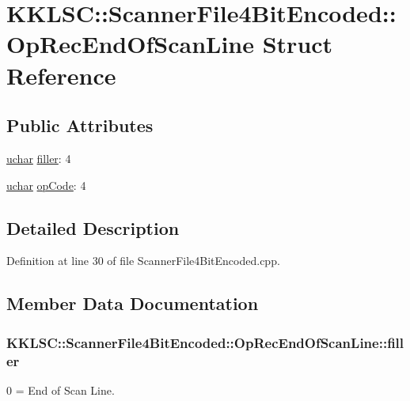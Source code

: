 \hypertarget{struct_scanner_file4_bit_encoded_1_1_op_rec_end_of_scan_line}{}\section{K\+K\+L\+SC\+:\+:Scanner\+File4\+Bit\+Encoded\+:\+:Op\+Rec\+End\+Of\+Scan\+Line Struct Reference}
\label{struct_scanner_file4_bit_encoded_1_1_op_rec_end_of_scan_line}
\subsection*{Public Attributes}
\begin{DoxyCompactItemize}
\item 
\hyperlink{namespace_k_k_b_ace9969169bf514f9ee6185186949cdf7}{uchar} \hyperlink{struct_scanner_file4_bit_encoded_1_1_op_rec_end_of_scan_line_ac7bd3d5670d4444b349b816d2b52c63d}{filler}\+: 4
\item 
\hyperlink{namespace_k_k_b_ace9969169bf514f9ee6185186949cdf7}{uchar} \hyperlink{struct_scanner_file4_bit_encoded_1_1_op_rec_end_of_scan_line_a26b256b20e4d267cbf6845f678cc4966}{op\+Code}\+: 4
\end{DoxyCompactItemize}


\subsection{Detailed Description}


Definition at line 30 of file Scanner\+File4\+Bit\+Encoded.\+cpp.



\subsection{Member Data Documentation}
\subsubsection[{\texorpdfstring{filler}{filler}}]{ K\+K\+L\+S\+C\+::\+Scanner\+File4\+Bit\+Encoded\+::\+Op\+Rec\+End\+Of\+Scan\+Line\+::filler}\hypertarget{struct_scanner_file4_bit_encoded_1_1_op_rec_end_of_scan_line_ac7bd3d5670d4444b349b816d2b52c63d}{}\label{struct_scanner_file4_bit_encoded_1_1_op_rec_end_of_scan_line_ac7bd3d5670d4444b349b816d2b52c63d}
0 = End of Scan Line. 

